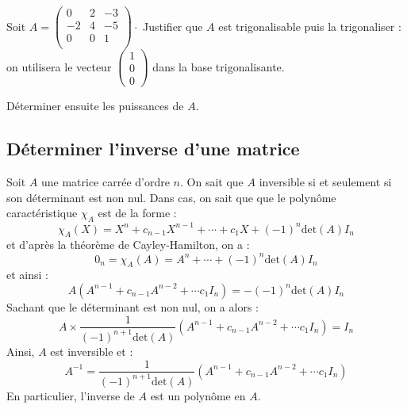 \documentclass[a4paper,10pt]{report}
\begin{document}
\medskip

\begin{ex} Soit $A = \begin{pmatrix}
0 & 2 & -3 \\
-2 & 4 & -5 \\
0 & 0 & 1 \\
\end{pmatrix} \cdot$
Justifier que $A$ est trigonalisable puis la trigonaliser : on utilisera le vecteur $\begin{pmatrix}
1 \\
0 \\
0 
\end{pmatrix}$ dans la base trigonalisante.

\medskip

\noindent Déterminer ensuite les puissances de $A$.

\vspace{15cm}
\end{ex}
\newpage
\subsection{Déterminer l'inverse d'une matrice}

\noindent Soit $A$ une matrice carrée d'ordre $n$. On sait que $A$ inversible si et seulement si son déterminant est non nul. Dans cas, on sait que   que le polynôme caractéristique $\chi_A$ est de la forme :
$$ \chi_A(X) = X^n + c_{n-1} X^{n-1}+ \cdots + c_1 X+  (-1)^n \textrm{det}(A) I_n$$
et d'après la théorème de Cayley-Hamilton, on a :
$$ 0_n = \chi_A(A) =  A^n + \cdots + (-1)^n \textrm{det}(A) I_n$$
et ainsi :
$$ A( A^{n-1} + c_{n-1} A^{n-2} + \cdots c_1 I_n) = -(-1)^n \textrm{det}(A) I_n$$
Sachant que le déterminant est non nul, on a alors :
$$ A \times \frac{1}{(-1)^{n+1} \textrm{det}(A)} ( A^{n-1} + c_{n-1} A^{n-2} + \cdots c_1 I_n) = I_n$$
Ainsi, $A$ est inversible et :
$$ A^{-1} =  \frac{1}{(-1)^{n+1} \textrm{det}(A)} ( A^{n-1} + c_{n-1} A^{n-2} + \cdots c_1 I_n)$$
En particulier, l'inverse de $A$ est un polynôme en $A$.
\end{document}
